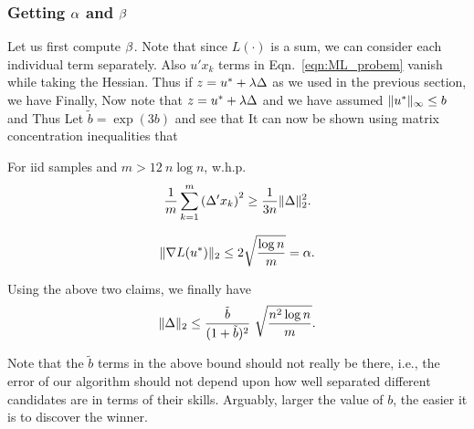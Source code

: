 \documentclass[letterpaper, 11pt, reqno]{amsart}
\begin{document}
\subsubsection{Getting $\alpha$ and $\beta$}
Let us first compute $\beta$. Note that since $L(\cdot)$ is a sum, we can consider each individual term separately. Also $u' x_k$ terms in Eqn.~\eqref{eqn:ML_probem} vanish while taking the Hessian. Thus if $z = u^* + \lambda \Delta$ as we used in the previous section, we have
Finally,
Now note that $z = u^* + \lambda \Delta$ and we have assumed $\lVert u^*\rVert_\infty \leq b$ and  Thus
Let $\tilde{b} = \exp(3b)$ and see that
It can now be shown using matrix concentration inequalities that
\begin{claim}
For iid samples and $m > 12\ n \log n$, w.h.p.
$$
\frac{1}{m} \sum_{k=1}^m \left(\Delta' x_k\right)^2 \geq \frac{1}{3n} \lVert\Delta\rVert^2_2.
$$
\end{claim}
\begin{claim}
$$\lVert\nabla L(u^*)\rVert_2 \leq 2 \sqrt{\frac{\log n}{m}} = \alpha.$$
\end{claim}
Using the above two claims, we finally have
$$
\norm{\D}_2 \leq \f{\tilde{b}}{(1+\tilde{b})^2}\ \sqrt{\f{n^2 \log n}{m}}.
$$
\begin{remark}
Note that the $\tilde{b}$ terms in the above bound should not really be there, i.e., the error of our algorithm should not depend upon how well separated different candidates are in terms of their skills. Arguably, larger the value of $b$, the easier it is to discover the winner.

\end{remark}
\end{document}
